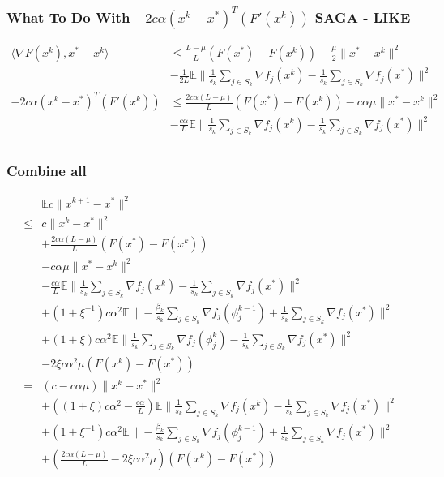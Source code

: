 \documentclass[12pt]{article}
\begin{document}
		\subsubsection{What To Do With $-2c \alpha  (x^k - x^* )^T ( F'(x^k))$ SAGA - LIKE}
		\begin{align*}
			\langle \nabla F(x^k), x^*- x^k \rangle &\leq \frac{L - \mu}{L}( F(x^*)-F(x^k)) - \frac{\mu}{2}\|x^* - x^k\|^2\\
			&- \frac{1}{2 L }\mathbb{E} \| \frac{1}{s_k} \sum_{j \in S_k}   \nabla f_j(x^k) -\frac{1}{s_k} \sum_{j \in S_k}   \nabla f_j(x^*) \|^2 \\
			-2c \alpha  (x^k - x^* )^T ( F'(x^k)) &\leq \frac{2c \alpha(L - \mu)}{L}( F(x^*)-F(x^k))  - c \alpha \mu \|x^* - x^k\|^2 \\
			&-\frac{c \alpha}{L }\mathbb{E} \| \frac{1}{s_k} \sum_{j \in S_k}   \nabla f_j(x^k) -\frac{1}{s_k} \sum_{j \in S_k}   \nabla f_j(x^*) \|^2 \\
		\end{align*}
		
	
	\subsubsection{Combine all}

	\begin{align*}
		&\mathbb{E} c \|x^{k+1} - x^* \|^2  \\
		\leq  & c\|x^k - x^* \|^2 \\
		&  +\frac{2c \alpha(L - \mu)}{L}( F(x^*)-F(x^k))  \\
		&- c \alpha \mu \|x^* - x^k\|^2\\
		&- \frac{c \alpha}{L }\mathbb{E} \| \frac{1}{s_k} \sum_{j \in S_k}   \nabla f_j(x^k) -\frac{1}{s_k} \sum_{j \in S_k}   \nabla f_j(x^*) \|^2\\
		&+(1+\xi^{-1})c \alpha^2\mathbb{E}   \|  - \frac{ \beta_k }{s_k} \sum_{j \in S_k}  \nabla f_j(\phi^{k-1}_j) + \frac{ 1}{s_k} \sum_{j \in S_k}  \nabla f_j(x^*)\|^2 \\
	&+ (1+\xi)c \alpha^2 \mathbb{E} \| \frac{1}{s_k} \sum_{j \in S_k}  \nabla f_j(\phi_j^{k}) - \frac{ 1 }{s_k} \sum_{j \in S_k}  \nabla f_j(x^*)\|^2  \\
	&- 2 \xi c \alpha^2 \mu (F(x^k) - F(x^*))\\
	=  &( c-c \alpha \mu)\|x^k - x^* \|^2 \\
		&+ ((1+\xi)c \alpha^2 - \frac{c \alpha }{L})\mathbb{E} \| \frac{1}{s_k} \sum_{j \in S_k}   \nabla f_j(x^k) -\frac{1}{s_k} \sum_{j \in S_k}   \nabla f_j(x^*) \|^2\\
		&+(1+\xi^{-1})c \alpha^2\mathbb{E}   \|  - \frac{ \beta_k }{s_k} \sum_{j \in S_k}  \nabla f_j(\phi^{k-1}_j) + \frac{ 1}{s_k} \sum_{j \in S_k}  \nabla f_j(x^*)\|^2 \\
	&+( \frac{2c \alpha(L - \mu)}{L}- 2 \xi c \alpha^2 \mu) (F(x^k) - F(x^*))
		\end{align*}
		
\end{document}
